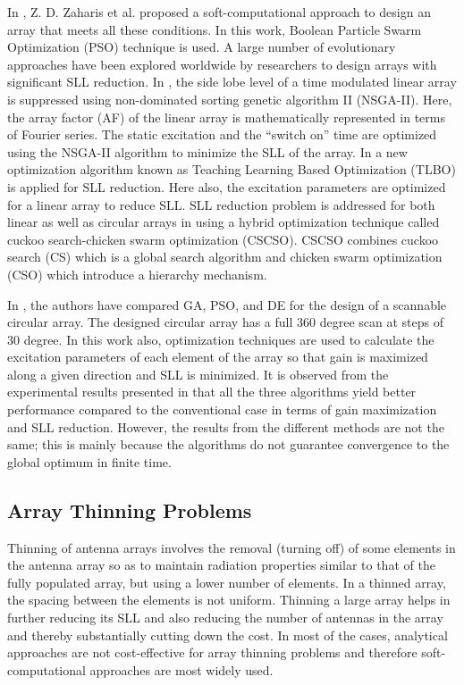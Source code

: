 In \cite{arraySynth1}, Z. D. Zaharis et al. proposed a soft-computational approach to design an array that meets all these conditions. In this work, Boolean Particle Swarm Optimization (PSO) technique is used. A large number of evolutionary approaches have been explored worldwide by researchers to design arrays with significant SLL reduction. In \cite{arraySynth2}, the side lobe level of a time modulated linear array is suppressed using non-dominated sorting genetic algorithm II (NSGA-II). Here, the array factor (AF) of the linear array is mathematically represented in terms of Fourier series. The static excitation and the ``switch on'' time are optimized using the NSGA-II algorithm to minimize the SLL of the array. In \cite{arraySynth3} a new optimization algorithm known as Teaching Learning Based Optimization (TLBO) is applied for SLL reduction. Here also, the excitation parameters are optimized for a linear array to reduce SLL. SLL reduction problem is addressed for both linear as well as circular arrays in \cite{arraySynth4} using a hybrid optimization technique called cuckoo search-chicken swarm optimization (CSCSO). CSCSO combines cuckoo search (CS) which is a global search algorithm and chicken swarm optimization (CSO) which introduce a hierarchy mechanism.

In \cite{compCAD4Arry}, the authors have compared GA, PSO, and DE for the design of a scannable circular array. The designed circular array has a full 360 degree scan at steps of 30 degree. In this work also, optimization techniques are used to calculate the excitation parameters of each element of the array so that gain is maximized along a given direction and SLL is minimized. It is observed from the experimental results presented in \cite{compCAD4Arry} that all the three algorithms yield better performance compared to the conventional case in terms of gain maximization and SLL reduction. However, the results from the different methods are not the same; this is mainly because the algorithms do not guarantee convergence to the global optimum in finite time.

\subsection{Array Thinning Problems}
Thinning of antenna arrays involves the removal (turning off) of some elements in the antenna array so as to maintain radiation properties similar to that of the fully populated array, but using a lower number of elements. In a thinned array, the spacing between the elements is not uniform. Thinning a large array helps in further reducing its SLL and also reducing the number of antennas in the array and thereby substantially cutting down the cost. In most of the cases, analytical approaches are not cost-effective for array thinning problems and therefore soft-computational approaches are most widely used.

